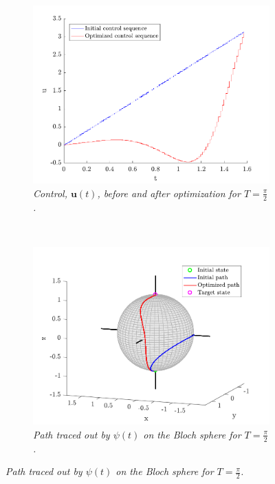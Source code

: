 \begin{figure}[h!]
    \centering
    \begin{subfigure}[t]{0.49\textwidth}
        \includegraphics[width=\textwidth]{Figures/control.pdf}
        \caption{\textit{Control, $\boldsymbol{u}(t)$, before and after optimization for $T = \frac{\pi}{2}$.}}
        \label{fig:control}
    \end{subfigure}
    ~
    \begin{subfigure}[t]{0.49\textwidth}
        \includegraphics[width=\textwidth]{Figures/path.pdf}
        \caption{\textit{Path traced out by $\psi (t)$ on the Bloch sphere for $T = \frac{\pi}{2}$.}}
        \label{fig:path}
    \end{subfigure}         

\end{figure}
